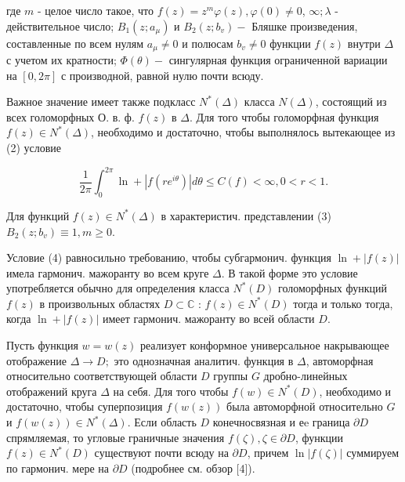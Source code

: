 \documentclass[10pt]{article}
\begin{document}
где $m$ - целое число такое, что $f(z)=z^{m} \varphi(z), \varphi(0) \neq 0$, $\infty ; \lambda$ - действительное число; $B_{1}\left(z ; a_{\mu}\right)$ и $B_{2}\left(z ; b_{v}\right)-$ Бляшке произведения, составленные по всем нулям $a_{\mu} \neq 0$ и полюсам $b_{v} \neq 0$ функции $f(z)$ внутри $\Delta$ с учетом их кратности; $\Phi(\theta)-$ сингулярная функция ограниченной вариации на $[0,2 \pi]$ с производной, равной нулю почти всюду.



Важное значение имеет также подкласс $N^{*}(\Delta)$ класса $N(\Delta)$, состоящий из всех голоморфных О. в. ф. $f(z)$ в $\Delta$. Для того чтобы голоморфная функция $f(z) \in N^{*}(\Delta)$, необходимо и достаточно, чтобы выполнялось вытекающее из (2) условие



\[

\frac{1}{2 \pi} \int_{0}^{2 \pi} \ln +\left|f\left(r e^{i \theta}\right)\right| d \theta \leqslant C(f)<\infty, 0<r<1 .

\]



Для функций $f(z) \in N^{*}(\Delta)$ в характеристич. представлении (3) $B_{2}\left(z ; b_{v}\right) \equiv 1, m \geqslant 0$.



Условие (4) равносильно требованию, чтобы субгармонич. функция $\ln +|f(z)|$ имела гармонич. мажоранту во всем круге $\Delta$. В такой форме это условие употребляется обычно для определения класса $N^{*}(D)$ голоморфных функций $f(z)$ в произвольных областях $D \subset \mathbb{C}$ : $f(z) \in N^{*}(D)$ тогда и только тогда, когда $\ln +|f(z)|$ имеет гармонич. мажоранту во всей области $D$.



Пусть функция $w=w(z)$ реализует конформное универсальное накрывающее отображение $\Delta \rightarrow D ;$ это однозначная аналитич. функция в $\Delta$, автоморфная относительно соответствующей области $D$ группы $G$ дробно-линейных отображений круга $\Delta$ на себя. Для того чтобы $f(w) \in N^{*}(D)$, необходимо и достаточно, чтобы суперпозиция $f(w(z))$ была автоморфной относительно $G$ и $f(w(z)) \in N^{*}(\Delta)$. Если область $D$ конечносвязная и еe граница $\partial D$ спрямляемая, то угловые граничные значения $f(\zeta), \zeta \in \partial D$, функции $f(z) \in N^{*}(D)$ существуют почти всюду на $\partial D$, причем $\ln |f(\zeta)|$ суммируем по гармонич. мере на $\partial D$ (подробнее см. обзор [4]).
\end{document}
